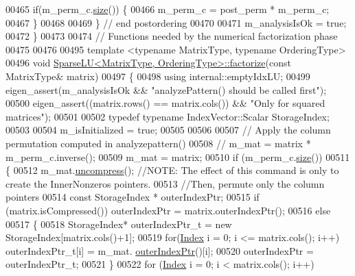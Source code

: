 \begin{DoxyCode}
00465     \textcolor{keywordflow}{if}(m\_perm\_c.\hyperlink{group___core___module_a2216f9ce7b453ac39c46ff0323daeac9}{size}()) \{
00466       m\_perm\_c = post\_perm * m\_perm\_c;
00467     \}
00468     
00469   \} \textcolor{comment}{// end postordering }
00470   
00471   m\_analysisIsOk = \textcolor{keyword}{true}; 
00472 \}
00473 
00474 \textcolor{comment}{// Functions needed by the numerical factorization phase}
00475 
00476 
00495 \textcolor{keyword}{template} <\textcolor{keyword}{typename} MatrixType, \textcolor{keyword}{typename} OrderingType>
00496 \textcolor{keywordtype}{void} \hyperlink{group___sparse_l_u___module_a39858b0e72f2659d596364e252b34cbc}{SparseLU<MatrixType, OrderingType>::factorize}(\textcolor{keyword}{const} 
      MatrixType& matrix)
00497 \{
00498   \textcolor{keyword}{using} internal::emptyIdxLU;
00499   eigen\_assert(m\_analysisIsOk && \textcolor{stringliteral}{"analyzePattern() should be called first"}); 
00500   eigen\_assert((matrix.rows() == matrix.cols()) && \textcolor{stringliteral}{"Only for squared matrices"});
00501   
00502   \textcolor{keyword}{typedef} \textcolor{keyword}{typename} IndexVector::Scalar StorageIndex; 
00503   
00504   m\_isInitialized = \textcolor{keyword}{true};
00505   
00506   
00507   \textcolor{comment}{// Apply the column permutation computed in analyzepattern()}
00508   \textcolor{comment}{//   m\_mat = matrix * m\_perm\_c.inverse(); }
00509   m\_mat = matrix;
00510   \textcolor{keywordflow}{if} (m\_perm\_c.\hyperlink{group___core___module_a2216f9ce7b453ac39c46ff0323daeac9}{size}()) 
00511   \{
00512     m\_mat.\hyperlink{group___sparse_core___module_a7e560ebda035e992d2c99875cc7c3af3}{uncompress}(); \textcolor{comment}{//NOTE: The effect of this command is only to create the InnerNonzeros
       pointers.}
00513     \textcolor{comment}{//Then, permute only the column pointers}
00514     \textcolor{keyword}{const} StorageIndex * outerIndexPtr;
00515     \textcolor{keywordflow}{if} (matrix.isCompressed()) outerIndexPtr = matrix.outerIndexPtr();
00516     \textcolor{keywordflow}{else}
00517     \{
00518       StorageIndex* outerIndexPtr\_t = \textcolor{keyword}{new} StorageIndex[matrix.cols()+1];
00519       \textcolor{keywordflow}{for}(\hyperlink{namespace_eigen_a62e77e0933482dafde8fe197d9a2cfde}{Index} i = 0; i <= matrix.cols(); i++) outerIndexPtr\_t[i] = m\_mat.
      \hyperlink{group___sparse_core___module_a75506964d86d6badb32d0b4917acf2e2}{outerIndexPtr}()[i];
00520       outerIndexPtr = outerIndexPtr\_t;
00521     \}
00522     \textcolor{keywordflow}{for} (\hyperlink{namespace_eigen_a62e77e0933482dafde8fe197d9a2cfde}{Index} i = 0; i < matrix.cols(); i++)

\end{DoxyCode}
